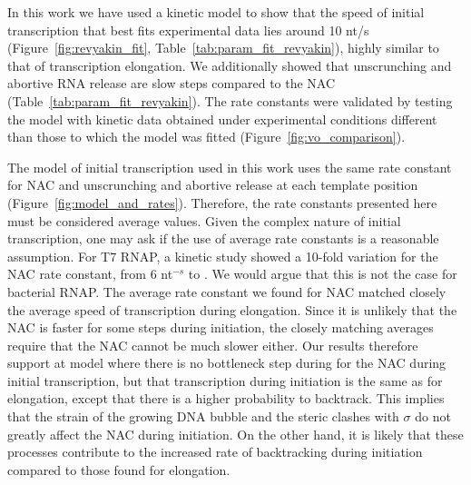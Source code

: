%
In this work we have used a kinetic model to show that the speed of initial
transcription that best fits experimental data lies around 10 nt/s
(Figure~\ref{fig:revyakin_fit}, Table~\ref{tab:param_fit_revyakin}), highly
similar to that of transcription elongation. We additionally showed that
unscrunching and abortive RNA release are slow steps compared to the NAC
(Table~\ref{tab:param_fit_revyakin}). The rate constants were validated by
testing the model with kinetic data obtained under experimental conditions
different than those to which the model was fitted
(Figure~\ref{fig:vo_comparison}).








The model of initial transcription used in this work uses the same rate
constant for NAC and unscrunching and abortive release at each template
position (Figure~\ref{fig:model_and_rates}). Therefore, the rate constants
presented here must be considered average values. Given the complex nature of
initial transcription, one may ask if the use of average rate constants is a reasonable
assumption. For T7 RNAP, a kinetic study showed a 10-fold variation for the
NAC rate constant, from 6 nt$^{-s}$ to \cite{tang_real-time_2009}. We would
argue that this is not the case for bacterial RNAP. The average rate constant
we found for NAC matched closely the average speed of transcription during
elongation. Since it is unlikely that the NAC is faster for some steps during
initiation, the closely matching averages require that the NAC cannot be much
slower either. Our results therefore support at model where there is no
bottleneck step during for the NAC during initial transcription, but that
transcription during initiation is the same as for elongation, except that
there is a higher probability to backtrack. This implies that the strain of
the growing DNA bubble and the steric clashes with $\sigma$ do not greatly
affect the NAC during initiation. On the other hand, it is likely that these
processes contribute to the increased rate of backtracking during initiation
compared to those found for elongation.

